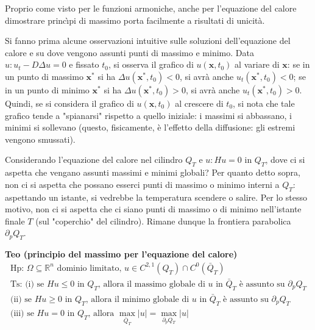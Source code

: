 \documentclass{article}
\begin{document}
Proprio come visto per le funzioni armoniche, anche per l'equazione del
calore dimostrare princ\`{\i}pi di massimo porta facilmente a risultati di
unicit\`{a}.

Si fanno prima alcune osservazioni intuitive sulle soluzioni dell'equazione
del calore e su dove vengono assunti punti di massimo e minimo. Data $%
u:u_{t}-D\Delta u=0$ e fissato $t_{0}$, si osserva il grafico di $u\left( 
\mathbf{x},t_{0}\right) $ al variare di $\mathbf{x}$: se in un punto di
massimo $\mathbf{x}^{\ast }$ si ha $\Delta u\left( \mathbf{x}^{\ast
},t_{0}\right) <0$, si avr\`{a} anche $u_{t}\left( \mathbf{x}^{\ast
},t_{0}\right) <0$; se in un punto di minimo $\mathbf{x}^{\ast }$ si ha $%
\Delta u\left( \mathbf{x}^{\ast },t_{0}\right) >0$, si avr\`{a} anche $%
u_{t}\left( \mathbf{x}^{\ast },t_{0}\right) >0$. Quindi, se si considera il
grafico di $u\left( \mathbf{x},t_{0}\right) $ al crescere di $t_{0}$,
si nota che tale grafico tende a "spianarsi" rispetto a quello iniziale: i
massimi si abbassano, i minimi si sollevano (questo, fisicamente, \`{e}
l'effetto della diffusione: gli estremi vengono smussati).

Considerando l'equazione del calore nel cilindro $Q_{T}$ e $u:Hu=0$ in $%
Q_{T} $, dove ci si aspetta che vengano assunti massimi e minimi globali?
Per quanto detto sopra, non ci si aspetta che possano esserci punti di
massimo o minimo interni a $Q_{T}$: aspettando un istante, si vedrebbe la
temperatura scendere o salire. Per lo stesso motivo, non ci si aspetta che
ci siano punti di massimo o di minimo nell'istante finale $T$ (sul
"coperchio" del cilindro). Rimane dunque la frontiera parabolica $%
\partial _{p}Q_{T}$.

\textbf{Teo (principio del massimo per l'equazione del calore)}
\begin{gather*}
\text{Hp: }\Omega \subseteq 
\mathbb{R}
^{n}\text{ dominio limitato, }u\in C^{2,1}\left( Q_{T}\right) \cap
C^{0}\left( \bar{Q}_{T}\right) \\
\text{Ts: (i) se }Hu\leq 0\text{ in }Q_{T}\text{, allora il massimo globale
di }u\text{ in }\bar{Q}_{T}\text{ \`{e} assunto su }\partial _{p}Q_{T} \\
\text{(ii) se }Hu\geq 0\text{ in }Q_{T}\text{, allora il minimo globale di }u%
\text{ in }\bar{Q}_{T}\text{ \`{e} assunto su }\partial _{p}Q_{T} \\
\text{(iii) se }Hu=0\text{ in }Q_{T}\text{, allora }\max_{\bar{Q}%
_{T}}\left\vert u\right\vert =\max_{\partial _{p}Q_{T}}\left\vert
u\right\vert
\end{gather*}
\end{document}
